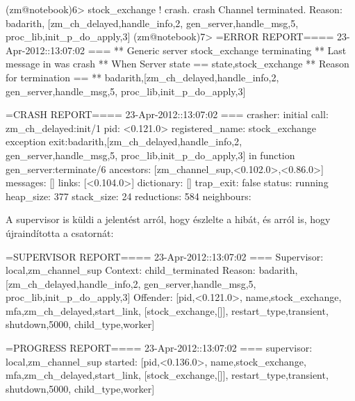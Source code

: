 \documentclass[12pt, a4paper, oneside]{book}
\begin{document}
\begin{code}{}{}
(zm@notebook)6> stock_exchange ! crash.                                          
crash
Channel terminated. Reason: {badarith,
    [{zm_ch_delayed,handle_info,2},
    {gen_server,handle_msg,5},
    {proc_lib,init_p_do_apply,3}]}
(zm@notebook)7> 
=ERROR REPORT==== 23-Apr-2012::13:07:02 ===
** Generic server stock_exchange terminating 
** Last message in was crash
** When Server state == {state,stock_exchange}
** Reason for termination == 
** {badarith,[{zm_ch_delayed,handle_info,2},
              {gen_server,handle_msg,5},
              {proc_lib,init_p_do_apply,3}]}

=CRASH REPORT==== 23-Apr-2012::13:07:02 ===
 crasher:
  initial call: zm_ch_delayed:init/1
  pid: <0.121.0>
  registered_name: stock_exchange
  exception exit:{badarith,[{zm_ch_delayed,handle_info,2},
                            {gen_server,handle_msg,5},
                            {proc_lib,init_p_do_apply,3}]}
  in function  gen_server:terminate/6
  ancestors: [zm_channel_sup,<0.102.0>,<0.86.0>]
  messages: []
  links: [<0.104.0>]
  dictionary: []
  trap_exit: false
  status: running
  heap_size: 377
  stack_size: 24
  reductions: 584
 neighbours:
\end{code}

A supervisor is küldi a jelentést arról, hogy észlelte a hibát, és arról is,
hogy újraindította a csatornát:

\begin{code}{}{}
=SUPERVISOR REPORT==== 23-Apr-2012::13:07:02 ===
     Supervisor: {local,zm_channel_sup}
     Context:    child_terminated
     Reason:     {badarith,[{zm_ch_delayed,handle_info,2},
                            {gen_server,handle_msg,5},
                            {proc_lib,init_p_do_apply,3}]}
     Offender:   [{pid,<0.121.0>},
                  {name,stock_exchange},
                  {mfa,{zm_ch_delayed,start_link,
                        [stock_exchange,[]]}},
                  {restart_type,transient},
                  {shutdown,5000},
                  {child_type,worker}]


=PROGRESS REPORT==== 23-Apr-2012::13:07:02 ===
          supervisor: {local,zm_channel_sup}
             started: [{pid,<0.136.0>},
                       {name,stock_exchange},
                       {mfa,{zm_ch_delayed,start_link,
                            [stock_exchange,[]]}},
                       {restart_type,transient},
                       {shutdown,5000},
                       {child_type,worker}]
\end{code}
\end{document}

